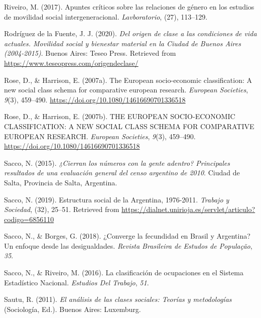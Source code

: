 \documentclass[
]{article}
\newlength{\cslhangindent}
\newlength{\cslentryspacingunit} %
\newenvironment{CSLReferences}[2] %
 {%
  \setlength{\parindent}{0pt}
  \ifodd #1
  \let\oldpar\par
  \def\par{\hangindent=\cslhangindent\oldpar}
  \fi
  \setlength{\parskip}{#2\cslentryspacingunit}
 }%
 {}
\begin{document}
\begin{CSLReferences}{1}{0}
\leavevmode{}%
Riveiro, M. (2017). Apuntes críticos sobre las relaciones de género en los estudios de movilidad social intergeneracional. \emph{Lavboratorio}, (27), 113--129.

\leavevmode{}%
Rodríguez de la Fuente, J. J. (2020). \emph{Del origen de clase a las condiciones de vida actuales. {Movilidad} social y bienestar material en la {Ciudad} de {Buenos} {Aires} (2004-2015)}. Buenos Aires: Teseo Press. Retrieved from \url{https://www.teseopress.com/origendeclase/}

\leavevmode{}%
Rose, D., \& Harrison, E. (2007a). The {European} socio-economic classification: A new social class schema for comparative european research. \emph{European Societies}, \emph{9}(3), 459--490. \url{https://doi.org/10.1080/14616690701336518}

\leavevmode{}%
Rose, D., \& Harrison, E. (2007b). {THE} {EUROPEAN} {SOCIO}-{ECONOMIC} {CLASSIFICATION}: {A} {NEW} {SOCIAL} {CLASS} {SCHEMA} {FOR} {COMPARATIVE} {EUROPEAN} {RESEARCH}. \emph{European Societies}, \emph{9}(3), 459--490. \url{https://doi.org/10.1080/14616690701336518}

\leavevmode{}%
Sacco, N. (2015). \emph{¿{Cierran} los números con la gente adentro? {Principales} resultados de una evaluación general del censo argentino de 2010}. Ciudad de Salta, Provincia de Salta, Argentina.

\leavevmode{}%
Sacco, N. (2019). Estructura social de la {Argentina}, 1976-2011. \emph{Trabajo y Sociedad}, (32), 25--51. Retrieved from \url{https://dialnet.unirioja.es/servlet/articulo?codigo=6856110}

\leavevmode{}%
Sacco, N., \& Borges, G. (2018). ¿{Converge} la fecundidad en {Brasil} y {Argentina}? {Un} enfoque desde las desigualdades. \emph{Revista Brasileira de Estudos de População}, \emph{35}.

\leavevmode{}%
Sacco, N., \& Riveiro, M. (2016). La clasificación de ocupaciones en el {Sistema} {Estadístico} {Nacional}. \emph{Estudios Del Trabajo}, \emph{51}.

\leavevmode{}%
Sautu, R. (2011). \emph{El análisis de las clases sociales: Teorías y metodologías} (Sociología, Ed.). Buenos Aires: Luxemburg.


\end{CSLReferences}
\end{document}

